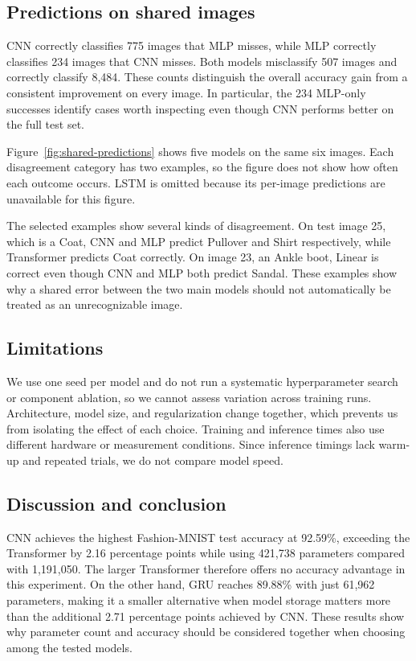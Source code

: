 \subsection{Predictions on shared images}\label{sec:qualitative}
CNN correctly classifies 775 images that MLP misses, while MLP correctly
classifies 234 images that CNN misses. Both models misclassify 507 images and
correctly classify 8,484. These counts distinguish the overall accuracy gain
from a consistent improvement on every image. In particular, the 234 MLP-only
successes identify cases worth inspecting even though CNN performs better on
the full test set.

Figure~\ref{fig:shared-predictions}  shows five models on the same six images.
Each disagreement category has two examples, so the figure does not show how
often each outcome occurs. LSTM is omitted because its per-image predictions
are unavailable for this figure.

The selected examples show several kinds of disagreement. On test image 25,
which is a Coat, CNN and MLP predict Pullover and Shirt respectively, while
Transformer predicts Coat correctly. On image 23, an Ankle boot, Linear is
correct even though CNN and MLP both predict Sandal. These examples show why a
shared error between the two main models should not automatically be treated
as an unrecognizable image.

\subsection{Limitations}
We use one seed per model and do not run a systematic hyperparameter search or
component ablation, so we cannot assess variation across training runs.
Architecture, model size, and regularization change together, which prevents us
from isolating the effect of each choice. Training and inference times also use
different hardware or measurement conditions. Since inference timings lack
warm-up and repeated trials, we do not compare model speed.

\subsection{Discussion and conclusion}
\label{sec:discussion}
CNN achieves the highest Fashion-MNIST test accuracy at 92.59\%, exceeding the
Transformer by 2.16 percentage points while using 421,738 parameters compared
with 1,191,050. The larger Transformer therefore offers no accuracy advantage
in this experiment. On the other hand, GRU reaches 89.88\% with just 61,962
parameters, making it a smaller alternative when model storage matters more
than the additional 2.71 percentage points achieved by CNN. These results show
why parameter count and accuracy should be considered together when choosing
among the tested models.

